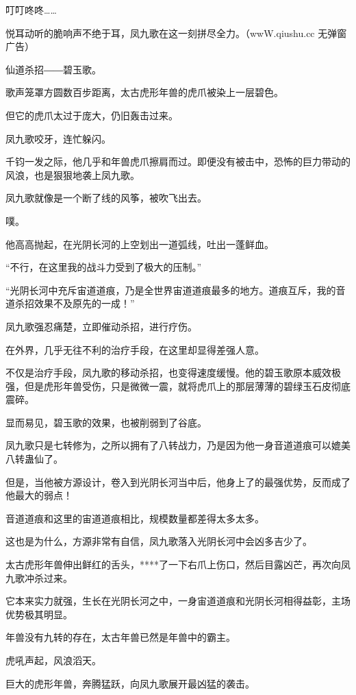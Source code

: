 
\begin{this_body}

叮叮咚咚……

悦耳动听的脆响声不绝于耳，凤九歌在这一刻拼尽全力。（wwW.qiushu.cc 无弹窗广告）

仙道杀招――碧玉歌。

歌声笼罩方圆数百步距离，太古虎形年兽的虎爪被染上一层碧色。

但它的虎爪太过于庞大，仍旧轰击过来。

凤九歌咬牙，连忙躲闪。

千钧一发之际，他几乎和年兽虎爪擦肩而过。即便没有被击中，恐怖的巨力带动的风浪，也是狠狠地袭上凤九歌。

凤九歌就像是一个断了线的风筝，被吹飞出去。

噗。

他高高抛起，在光阴长河的上空划出一道弧线，吐出一蓬鲜血。

“不行，在这里我的战斗力受到了极大的压制。”

“光阴长河中充斥宙道道痕，乃是全世界宙道道痕最多的地方。道痕互斥，我的音道杀招效果不及原先的一成！”

凤九歌强忍痛楚，立即催动杀招，进行疗伤。

在外界，几乎无往不利的治疗手段，在这里却显得差强人意。

不仅是治疗手段，凤九歌的移动杀招，也变得速度缓慢。他的碧玉歌原本威效极强，但是虎形年兽受伤，只是微微一震，就将虎爪上的那层薄薄的碧绿玉石皮彻底震碎。

显而易见，碧玉歌的效果，也被削弱到了谷底。

凤九歌只是七转修为，之所以拥有了八转战力，乃是因为他一身音道道痕可以媲美八转蛊仙了。

但是，当他被方源设计，卷入到光阴长河当中后，他身上了的最强优势，反而成了他最大的弱点！

音道道痕和这里的宙道道痕相比，规模数量都差得太多太多。

这也是为什么，方源非常有自信，凤九歌落入光阴长河中会凶多吉少了。

太古虎形年兽伸出鲜红的舌头，****了一下右爪上伤口，然后目露凶芒，再次向凤九歌冲杀过来。

它本来实力就强，生长在光阴长河之中，一身宙道道痕和光阴长河相得益彰，主场优势极其明显。

年兽没有九转的存在，太古年兽已然是年兽中的霸主。

虎吼声起，风浪滔天。

巨大的虎形年兽，奔腾猛跃，向凤九歌展开最凶猛的袭击。


\end{this_body}
